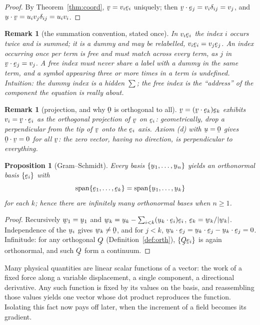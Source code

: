 \documentclass[17pt,a4paper]{extreport}
\DeclareRobustCommand{\vek}[1]{\underaccent{\tilde}{#1}}
\newcommand{\bu}{\vek{u}}
\newcommand{\bv}{\vek{v}}
\newcommand{\bw}{\vek{w}}
\newcommand{\be}{\vek{e}}
\newcommand{\bze}{\vek{0}}
\newcommand{\bQ}{\vek{Q}}
\newcommand{\dd}{\delta}
\newcommand{\ip}[2]{#1\cdot#2}
\theoremstyle{scplain}
\newtheorem{proposition}[theorem]{Proposition}
\theoremstyle{scdefn}
\newtheorem{remark}[theorem]{Remark}
\theoremstyle{scplain}
\begin{document}
\begin{proof}
By Theorem~\ref{thm:coord}, $\bv=v_{i}\be_{i}$ uniquely; then
$\ip\bv{\be_{j}}=v_{i}\dd_{ij}=v_{j}$, and
$\ip\bu\bv=u_{i}v_{j}\dd_{ij}=u_{i}v_{i}$.
\end{proof}

\begin{remark}[the summation convention, stated once]\label{rem:sum}
In $v_{i}\be_{i}$ the index $i$ occurs twice and is summed; it is a dummy
and may be relabelled, $v_{i}\be_{i}=v_{j}\be_{j}$. An index occurring once
per term is free and must match across every term, as $j$ in
$\ip\bv{\be_{j}}=v_{j}$. A free index must never share a label with a dummy
in the same term, and a symbol appearing three or more times in a term is
undefined. Intuition: the dummy index is a hidden $\textstyle\sum$; the
free index is the ``address'' of the component the equation is really
about.
\end{remark}

\begin{remark}[projection, and why $\bze$ is orthogonal to all]\label{rem:proj}
$\bv=(\ip\bv{\be_{k}})\be_{k}$ exhibits $v_{i}=\ip\bv{\be_{i}}$ as the
orthogonal projection of $\bv$ on $\be_{i}$: geometrically, drop a
perpendicular from the tip of $\bv$ onto the $\be_i$ axis. Axiom (d) with
$\bu=\bze$ gives $\ip\bze\bv=0$ for all $\bv$: the zero vector, having no
direction, is perpendicular to everything.
\end{remark}

\begin{proposition}[Gram--Schmidt]\label{prop:gs}
Every basis $\{\bu_{1},\dots,\bu_{n}\}$ yields an orthonormal basis
$\{\be_{i}\}$ with
\[\operatorname{span}\{\be_{1},\dots,\be_{k}\}
=\operatorname{span}\{\bu_{1},\dots,\bu_{k}\}\]
for each $k$; hence there are
infinitely many orthonormal bases when $n\ge1$.
\end{proposition}

\begin{proof}
Recursively $\bw_{1}=\bu_{1}$ and
$\bw_{k}=\bu_{k}-\sum_{i<k}(\ip{\bu_{k}}{\be_{i}})\be_{i}$,
$\be_{k}=\bw_{k}/|\bw_{k}|$. Independence of the $\bu_i$ gives
$\bw_{k}\neq\bze$, and for $j<k$,
$\ip{\bw_{k}}{\be_{j}}=\ip{\bu_{k}}{\be_{j}}-\ip{\bu_{k}}{\be_{j}}=0$.
Infinitude: for any orthogonal $\bQ$ (Definition~\ref{def:orth}),
$\{\bQ\be_{i}\}$ is again orthonormal, and such $\bQ$ form a continuum.
\end{proof}

Many physical quantities are linear scalar functions of a vector: the work
of a fixed force along a variable displacement, a single component, a
directional derivative. Any such function is fixed by its values on the
basis, and reassembling those values yields one vector whose dot product
reproduces the function. Isolating this fact now pays off later, when the
increment of a field becomes its gradient.
\end{document}
